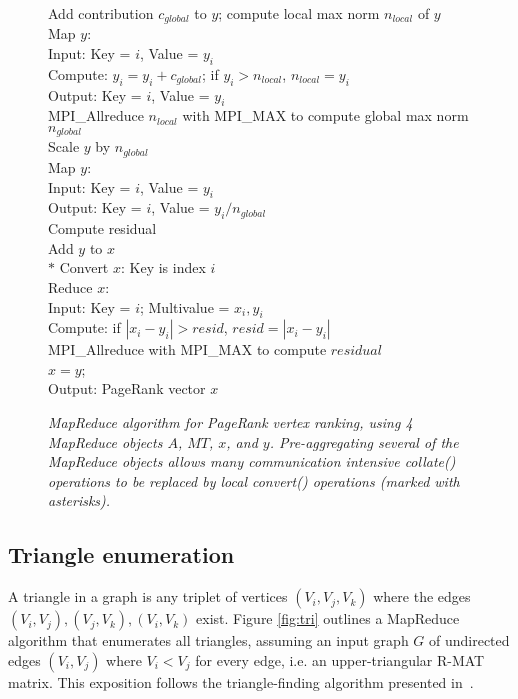 \begin{figure}[htb]
\begin{center}
{\begin{minipage}{\textwidth}
\begin{tabbing}
 Add contribution $c_{global}$ to $y$; compute local max norm $n_{local}$ of $y$ \\
\> \> Map $y$:  \\
\> \> \> Input:  Key = $i$, Value = $y_i$ \\
\> \> \> Compute: $y_i = y_i + c_{global}$; if $y_i > {n_{local}}$, $n_{local} = y_i$ \\
\> \> \> Output:  Key = $i$, Value = $y_i$ \\
\> \> MPI\_Allreduce $n_{local}$ with MPI\_MAX to compute global max norm $n_{global}$ \\
 Scale $y$ by $n_{global}$ \\
\> \> Map $y$: \\
\> \> \> Input:  Key = $i$, Value = $y_i$ \\
\> \> \> Output:  Key = $i$, Value = $y_i / {n_{global}}$ \\
 Compute residual \\
\> \> Add $y$ to $x$ \\
$*$\> \> Convert $x$:  Key is index $i$ \\
\> \> Reduce $x$:   \\
\> \> \> Input:  Key = $i$; Multivalue = $x_i, y_i$ \\
\> \> \> Compute:  if $|x_i - y_i| > {resid}$, ${resid} = |x_i - y_i|$ \\
\> \> MPI\_Allreduce with MPI\_MAX to compute $residual$ \\
 $x = y$; \\
Output: PageRank vector $x$
  \end{tabbing}
 \end{minipage}}\end{center}

 \caption{\it MapReduce algorithm for PageRank vertex ranking, using 4
 MapReduce objects $A$, $MT$, $x$, and $y$.  Pre-aggregating several
 of the MapReduce objects allows many communication intensive {\it
 collate()} operations to be replaced by local {\it convert()}
 operations (marked with asterisks).}

 \label{fig:pr2}
\end{figure}

\subsection{Triangle enumeration}

A triangle in a graph is any triplet of vertices $(V_i,V_j,V_k)$ where
the edges $(V_i,V_j), (V_j,V_k), (V_i,V_k)$ exist.  Figure
\ref{fig:tri} outlines a MapReduce algorithm that enumerates all
triangles, assuming an input graph $G$ of undirected edges $(V_i,V_j)$
where $V_i < V_j$ for every edge, i.e. an upper-triangular R-MAT
matrix.  This exposition follows the triangle-finding algorithm
presented in~\cite{Cohen09}.

